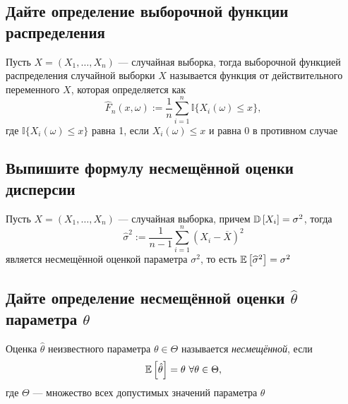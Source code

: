 \documentclass{article}
\begin{document}
\subsection{Дайте определение выборочной функции распределения}
 Пусть $X=(X_1,\ldots,X_n)$ — случайная выборка, тогда выборочной функцией распределения случайной выборки $X$ называется функция от действительного переменного $X$, которая определяется как
\begin{equation*}
    \widehat{F}_n(x,\omega):=\frac{1}{n}\sum_{i=1}^{n}\mathbb{I}\{X_i(\omega)\leqslant x\},
\end{equation*}
где $\mathbb{I}\{X_i(\omega)\leqslant x\}$ равна 1, если $X_i(\omega)\leqslant x$ и равна 0 в противном случае


\subsection{Выпишите формулу несмещённой оценки дисперсии}
\theorem Пусть $X=(X_1,\ldots,X_n)$ — случайная выборка, причем $\mathbb{D}\left[X_i\right]=\sigma^2$, тогда 
\begin{equation*}
    \widehat{\sigma}^2:=\displaystyle\frac{1}{n-1}\sum_{i=1}^n (X_i-\overline{X})^2
\end{equation*}
является несмещённой оценкой параметра $\sigma^2$, то есть $\mathbb{E}\left[\widehat{\sigma}^2\right]=\sigma^2$


\subsection{Дайте определение несмещённой оценки $\widehat{\theta}$ параметра $\theta$}
Оценка $\hat{\theta}$ неизвестного параметра $\theta\in\Theta$ называется \textit{несмещённой}, если 
\begin{equation*}
    \matwait{\hat{\theta}}=\theta\ \forall\theta\in\Theta,
\end{equation*}
где $\Theta$ — множество всех допустимых значений параметра $\theta$
\end{document}
